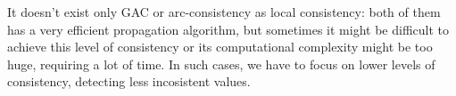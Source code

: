 It doesn't exist only GAC or arc-consistency as local consistency: both of them has a very efficient propagation algorithm, but sometimes it might 
be difficult to achieve this level of consistency or its computational complexity might be too huge, requiring a lot of time. In such cases, we have
to focus on lower levels of consistency, detecting less incosistent values.